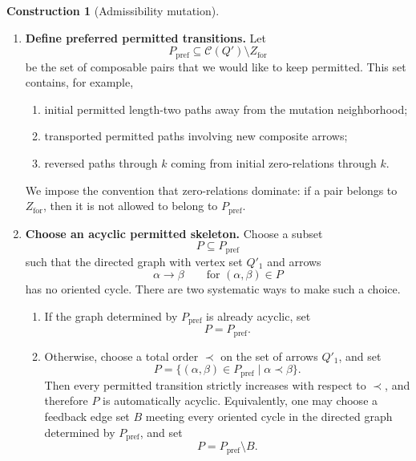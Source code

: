 \documentclass[11pt]{article}
\theoremstyle{plain}
\theoremstyle{definition}
\newtheorem{construction}[theorem]{Construction}
\theoremstyle{remark}
\begin{document}
\begin{construction}[Admissibility mutation]
\begin{enumerate}[label=\textbf{Step \arabic*.},leftmargin=3em]
\begin{enumerate}[label=(\alph*),leftmargin=2.5em]
    \item Through the mutated vertex \(k\), use the complement-transpose rule.
    Thus, for every initial path
    \[
      i\xrightarrow{\alpha_i}k\xrightarrow{\beta_j}j,
    \]
    put
    \[
      (\beta_j^*,\alpha_i^*)\in Z_{\mathrm{for}}
      \quad\text{whenever}\quad
      \beta_j\alpha_i\notin I.
    \]
    Equivalently,
    \[
      \alpha_i^*\beta_j^*\in I'
      \quad\text{whenever}\quad
      \beta_j\alpha_i\notin I.
    \]
    Hence an initial permitted path through \(k\) becomes a zero path through
    \(k\) after mutation, while an initial zero path through \(k\) becomes
    preferred permitted.
  \end{enumerate}

  \item \textbf{Define preferred permitted transitions.}
  Let
  \[
    P_{\mathrm{pref}}\subseteq \mathcal C(Q')\setminus Z_{\mathrm{for}}
  \]
  be the set of composable pairs that we would like to keep permitted.  This
  set contains, for example,
  \begin{enumerate}[label=(\alph*),leftmargin=2.5em]
    \item initial permitted length-two paths away from the mutation neighborhood;
    \item transported permitted paths involving new composite arrows;
    \item reversed paths through \(k\) coming from initial zero-relations through
    \(k\).
  \end{enumerate}
  We impose the convention that zero-relations dominate: if a pair belongs to
  \(Z_{\mathrm{for}}\), then it is not allowed to belong to \(P_{\mathrm{pref}}\).

  \item \textbf{Choose an acyclic permitted skeleton.}
  Choose a subset
  \[
    P\subseteq P_{\mathrm{pref}}
  \]
  such that the directed graph with vertex set \(Q'_1\) and arrows
  \[
    \alpha\longrightarrow \beta
    \qquad\text{for }(\alpha,\beta)\in P
  \]
  has no oriented cycle.  There are two systematic ways to make such a choice.

  \begin{enumerate}[label=(\alph*),leftmargin=2.5em]
    \item If the graph determined by \(P_{\mathrm{pref}}\) is already acyclic,
    set
    \[
      P=P_{\mathrm{pref}}.
    \]

    \item Otherwise, choose a total order \(\prec\) on the set of arrows
    \(Q'_1\), and set
    \[
      P=
      \{(\alpha,\beta)\in P_{\mathrm{pref}}
        \mid \alpha\prec \beta\}.
    \]
    Then every permitted transition strictly increases with respect to
    \(\prec\), and therefore \(P\) is automatically acyclic. Equivalently, one may choose a feedback edge set \(B\) meeting every
    oriented cycle in the directed graph determined by \(P_{\mathrm{pref}}\),
    and set
    \[
      P=P_{\mathrm{pref}}\setminus B.
    \]
  \end{enumerate}


\end{enumerate}
\end{construction}
\end{document}
